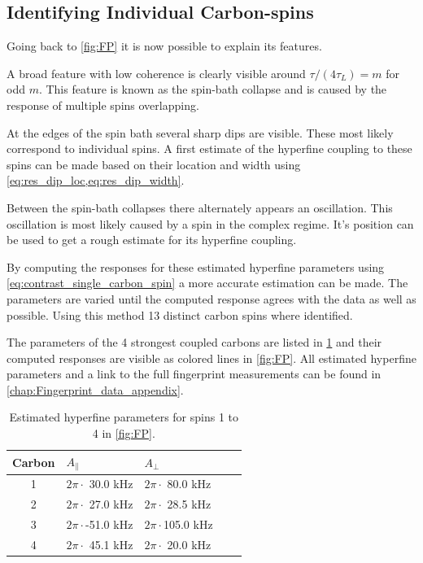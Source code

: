 \subsection{Identifying Individual Carbon-spins}
Going back to \cref{fig:FP} it is now possible to explain its features.

A broad feature with low coherence is clearly visible around $\tau/(4\tau_L) = m$ for odd $m$.
This feature is known as the spin-bath collapse and is caused by the response of multiple spins overlapping.

At the edges of the spin bath several sharp dips are visible. These most likely correspond to individual spins.
A first estimate of the hyperfine coupling to these spins can be made based on their location and width using \cref{eq:res_dip_loc,eq:res_dip_width}.

Between the spin-bath collapses there alternately appears an oscillation.
This oscillation is most likely caused by a spin in the complex regime.
It's position can be used to get a rough estimate for its hyperfine coupling.

By computing the responses for these estimated hyperfine parameters using \cref{eq:contrast_single_carbon_spin} a more accurate estimation can be made.
The parameters are varied until the computed response agrees with the data as well as possible.
Using this method 13 distinct carbon spins where identified.

The parameters of the 4 strongest coupled carbons are listed in \cref{tbl:HF_par} and their computed responses are visible as colored lines in \cref{fig:FP}.
All estimated hyperfine parameters and a link to the full fingerprint measurements can be found in \cref{chap:Fingerprint_data_appendix}.

\begin{table}[htbp]
\centering
    \begin{tabular}{cllll}
    Carbon & \quad \quad  $A_{\parallel} $ & \quad \quad $A_{\perp}$ \\ \hline
    1         & $2 \pi \cdot${ }30.0 kHz             & $2 \pi \cdot${ }80.0 kHz                \\
    2         & $2 \pi \cdot${ }27.0 kHz             & $2 \pi \cdot${ }28.5 kHz              \\
    3         & $2 \pi \cdot$-51.0 kHz          & $2 \pi \cdot$105.0 kHz              \\
    4         & $2 \pi \cdot${ }45.1 kHz           & $2 \pi \cdot${ }20.0 kHz                \\
    \end{tabular}
    \caption{Estimated hyperfine parameters for spins 1 to 4 in \cref{fig:FP}.}
    \label{tbl:HF_par}
\end{table}

